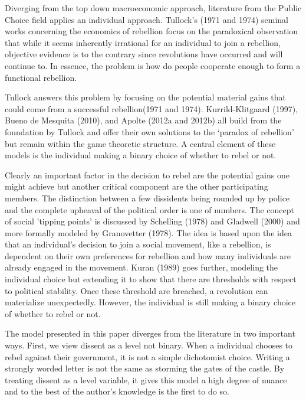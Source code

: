 \documentclass[12pt]{article}
\begin{document}
\begin{spacing}{1.5}


Diverging from the top down macroeconomic approach, literature from the Public Choice field applies an individual approach. Tullock's (1971 and 1974) seminal works concerning the economics of rebellion focus on the paradoxical observation that while it seems inherently irrational for an individual to join a rebellion, objective evidence is to the contrary since revolutions have occurred and will continue to. In essence, the problem is how do people cooperate enough to form a functional rebellion. 

Tullock answers this problem by focusing on the potential material gains that could come from a successful rebellion(1971 and 1974). Kurrild-Klitgaard (1997), Bueno de Mesquita (2010), and Apolte (2012a and 2012b) all build from the foundation by Tullock and offer their own solutions to the `paradox of rebellion' but remain within the game theoretic structure. A central element of these models is the individual making a binary choice of whether to rebel or not. 
 
Clearly an important factor in the decision to rebel are the potential gains one might achieve but another critical component are the other participating members. The distinction between a few dissidents being rounded up by police and the complete upheaval of the political order is one of numbers. The concept of social 'tipping points' is discussed by Schelling (1978) and Gladwell (2000) and more formally modeled by Granovetter (1978). The idea is based upon the idea that an individual's decision to join a social movement, like a rebellion, is dependent on their own preferences for rebellion and how many individuals are already engaged in the movement. Kuran (1989) goes further, modeling the individual choice but extending it to show that there are thresholds with respect to political stability. Once these threshold are breached, a revolution can materialize unexpectedly. However, the individual is still making a binary choice of whether to rebel or not. 


The model presented in this paper diverges from the literature in two important ways. First, we view dissent as a level not binary. When a individual chooses to rebel against their government, it is not a simple dichotomist choice. Writing a strongly worded letter is not the same as storming the gates of the castle. By treating dissent as a level variable, it gives this model a high degree of nuance and to the best of the author's knowledge is the first to do so. 


\end{spacing}
\end{document}
